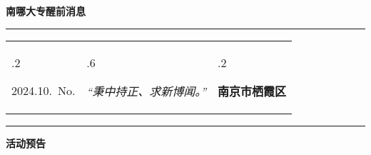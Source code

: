 \documentclass[letterpaper, 12pt]{article}
\begin{document}
\begin{center}
    \Huge\textbf{南哪大专醒前消息}
\end{center}
\vspace{4mm}
\hrule
\renewcommand\tabularxcolumn[1]{m{#1}}
\begin{tabularx}{\textwidth}{>{\hsize.2\hsize}X>{\hsize.6\hsize}X>{\hsize.2\hsize}X}
    \begin{flushleft}
        2024.10.\, No.
    \end{flushleft}
    &
    \begin{center}
        \textit{“秉中持正、求新博闻。”}
    \end{center}
    &
    \begin{flushright}
        \textbf{南京市栖霞区}
    \end{flushright}
\end{tabularx}
\vspace{-3.5mm}
\hrule
\vspace{4mm}
\centerline{\huge\textbf{活动预告}}
\end{document}
